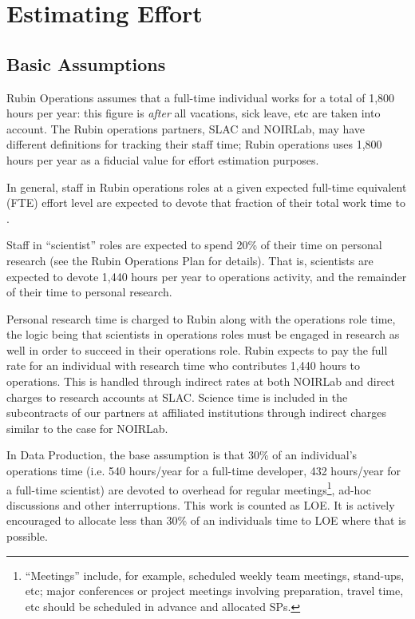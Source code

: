 \section{Estimating Effort}
\label{sec:effort}

\subsection{Basic Assumptions}


Rubin Operations assumes that a full-time individual works for a total of 1,800 hours per year: this figure is \emph{after} all vacations, sick leave, etc are taken into account.
The Rubin operations partners, SLAC and NOIRLab, may have different definitions for tracking their staff time; Rubin operations uses 1,800 hours per year as a fiducial value for effort estimation purposes.

In general, staff in Rubin operations roles at a given expected full-time equivalent (FTE) effort level are expected to devote that fraction of their total work time to \RO.

Staff in ``scientist'' roles are expected to spend 20\% of their time on personal research (see the Rubin Operations Plan for details).
That is, scientists are expected to devote 1,440 hours per
year to operations activity, and the remainder of their time to personal research.

Personal research time is charged to Rubin along with the operations role time, the logic being that
scientists in operations roles must be engaged in research as well in order to succeed in their operations role.
Rubin expects to pay the full rate for an individual with research time who contributes 1,440 hours to
operations.
This is handled through indirect rates at both NOIRLab and direct charges to research accounts at SLAC.
Science time is included in the subcontracts of our partners at affiliated institutions through indirect charges
similar to the case for NOIRLab.

In Data Production, the base assumption is that 30\% of an individual's \RO operations time (i.e. 540 hours/year for a full-time developer, 432 hours/year for a full-time scientist) are devoted to
overhead for regular meetings\footnote{``Meetings'' include, for example, scheduled weekly team meetings, stand-ups, etc;
major conferences or project meetings involving preparation, travel time, etc should be scheduled in advance and allocated \glspl{SP}.},
ad-hoc discussions and other interruptions.
This work is counted as \gls{LOE}.
It is actively encouraged to allocate less than 30\% of an individuals time to \gls{LOE} where that is possible.

